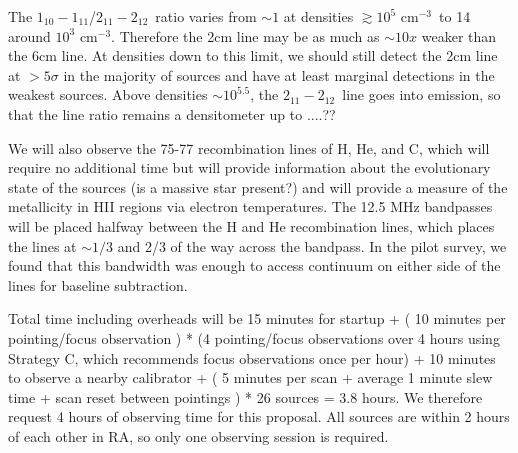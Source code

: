 \documentclass[11pt, preprint]{aastex}
\newcommand{\oneone}{\ensuremath{1_{10}-1_{11}}}
\newcommand{\twotwo}{\ensuremath{2_{11}-2_{12}}}
\newcommand{\percc}{\ensuremath{\textrm{cm}^{-3}}}
\begin{document}
The \oneone/\twotwo\ ratio varies from $\sim 1$ at densities $\gtrsim10^5$ \percc\ to 14
around $10^3$ \percc.  Therefore the 2cm line may be as much as $\sim10x$ weaker than
the 6cm line.  At densities down to this limit, we should still detect the 2cm
line at $>5\sigma$ in the majority of sources and have at least marginal
detections in the weakest sources.  Above densities $\sim10^{5.5}$, the \twotwo\ line goes
into emission, so that the line ratio remains a densitometer up to ....??


We will also observe the 75-77 recombination lines of H, He, and C, which will
require no additional time but will provide information about the evolutionary
state of the sources (is a massive star present?) and will provide a measure of
the metallicity in HII regions via electron temperatures.  The 12.5 MHz
bandpasses will be placed halfway between the H and He recombination lines,
which places the lines at $\sim1/3$ and 2/3 of the way across the bandpass.  In
the pilot survey, we found that this bandwidth was enough to access continuum
on either side of the lines for baseline subtraction.

Total time including overheads will be 15 minutes for startup  + ( 10 minutes
per pointing/focus observation ) * (4 pointing/focus observations over 4 hours
using Strategy C, which recommends focus observations once per hour) + 10
minutes to observe a nearby calibrator + ( 5 minutes per scan + average 1
minute slew time + scan reset between pointings ) * 26 sources = 3.8 hours.  We
therefore request 4 hours of observing time for this proposal.  All sources are
within 2 hours of each other in RA, so only one observing session is required.

{\vspace{-3.5mm}

}
\end{document}
